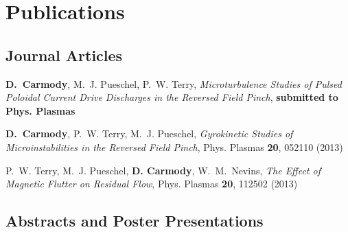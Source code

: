 \documentclass[letterpaper]{article}
\renewenvironment{itemize}{
  \begin{list}{}{
    \setlength{\leftmargin}{1.5em}
  }
}{
  \end{list}
}
\begin{document}
\section*{Publications}

\subsection*{Journal Articles}

\begin{itemize}
\item {\bf D.~Carmody}, M.~J. Pueschel, P.~W. Terry, {\it Microturbulence Studies of Pulsed Poloidal Current Drive Discharges in the Reversed Field Pinch}, {\bf submitted to Phys. Plasmas}
\item {\bf D.~Carmody}, P.~W. Terry, M.~J. Pueschel, {\it Gyrokinetic Studies of Microinstabilities in the Reversed Field Pinch}, Phys. Plasmas {\bf 20}, 052110 (2013)
\item P.~W. Terry, M.~J. Pueschel, {\bf D. Carmody}, W.~M.~Nevins, {\it The Effect of Magnetic Flutter on Residual Flow}, Phys. Plasmas {\bf 20}, 112502 (2013)
\end{itemize}

\subsection*{Abstracts and Poster Presentations}
\end{document}
